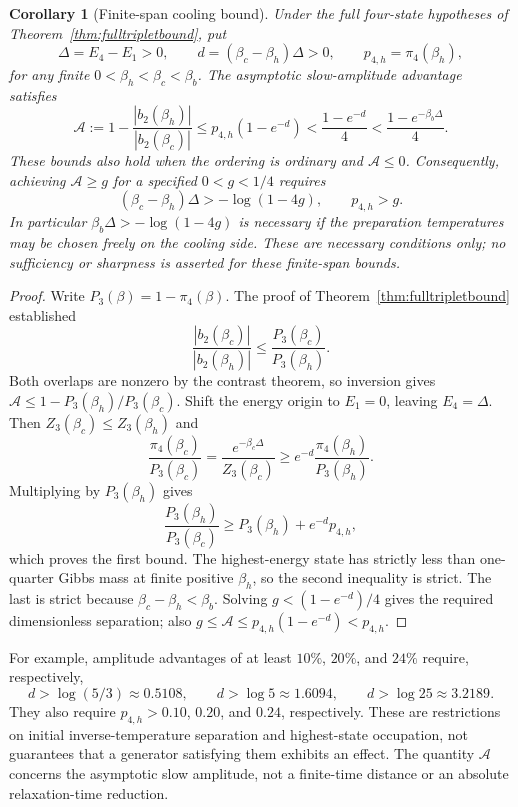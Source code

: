 \documentclass[11pt]{article}
\newtheorem{corollary}{Corollary}
\begin{document}
\begin{corollary}[Finite-span cooling bound]
\label{cor:finitespanamplitude}
Under the full four-state hypotheses of
Theorem~\ref{thm:fulltripletbound}, put
\[
\Delta=E_4-E_1>0,\qquad
 d=(\beta_c-\beta_h)\Delta>0,\qquad
 p_{4,h}=\pi_4(\beta_h),
\]
for any finite $0<\beta_h<\beta_c<\beta_b$. The asymptotic
slow-amplitude advantage satisfies
\begin{equation}\label{eq:finitespanamplitude}
\mathcal A:=1-\frac{|b_2(\beta_h)|}{|b_2(\beta_c)|}
\leq p_{4,h}(1-e^{-d})
<\frac{1-e^{-d}}4
<\frac{1-e^{-\beta_b\Delta}}4.
\end{equation}
These bounds also hold when the ordering is ordinary and
$\mathcal A\leq0$.
Consequently, achieving $\mathcal A\geq g$ for a specified
$0<g<1/4$ requires
\[
(\beta_c-\beta_h)\Delta> -\log(1-4g),
\qquad p_{4,h}>g.
\]
In particular $\beta_b\Delta> -\log(1-4g)$ is necessary if the
preparation temperatures may be chosen freely on the cooling side.
These are necessary conditions only; no sufficiency or sharpness is
asserted for these finite-span bounds.
\end{corollary}
\begin{proof}
Write $P_3(\beta)=1-\pi_4(\beta)$. The proof of
Theorem~\ref{thm:fulltripletbound} established
\[
\frac{|b_2(\beta_c)|}{|b_2(\beta_h)|}
\leq\frac{P_3(\beta_c)}{P_3(\beta_h)}.
\]
Both overlaps are nonzero by the contrast theorem, so inversion gives
$\mathcal A\leq1-P_3(\beta_h)/P_3(\beta_c)$.
Shift the energy origin to $E_1=0$, leaving $E_4=\Delta$.
Then $Z_3(\beta_c)\leq Z_3(\beta_h)$ and
\[
\frac{\pi_4(\beta_c)}{P_3(\beta_c)}
=\frac{e^{-\beta_c\Delta}}{Z_3(\beta_c)}
\geq e^{-d}\frac{\pi_4(\beta_h)}{P_3(\beta_h)}.
\]
Multiplying by $P_3(\beta_h)$ gives
\[
\frac{P_3(\beta_h)}{P_3(\beta_c)}
\geq P_3(\beta_h)+e^{-d}p_{4,h},
\]
which proves the first bound. The highest-energy state has strictly
less than one-quarter Gibbs mass at finite positive $\beta_h$, so the
second inequality is strict. The last is strict because
$\beta_c-\beta_h<\beta_b$. Solving
$g<(1-e^{-d})/4$ gives the required dimensionless separation; also
$g\leq\mathcal A\leq p_{4,h}(1-e^{-d})<p_{4,h}$.
\end{proof}

For example, amplitude advantages of at least $10\%$, $20\%$, and
$24\%$ require, respectively,
\[
d>\log(5/3)\approx0.5108,\qquad
d>\log5\approx1.6094,\qquad
d>\log25\approx3.2189.
\]
They also require $p_{4,h}>0.10$, $0.20$, and $0.24$, respectively.
These are restrictions on initial inverse-temperature separation and
highest-state occupation, not guarantees that a generator satisfying
them exhibits an effect. The quantity $\mathcal A$ concerns the
asymptotic slow amplitude, not a finite-time distance or an absolute
relaxation-time reduction.
\end{document}
